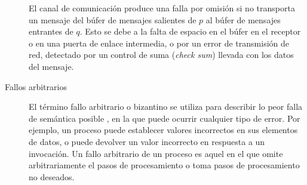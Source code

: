 \begin{description}
	El canal de comunicación produce una falla por omisión si no transporta	un mensaje del búfer de mensajes salientes de $p$ al búfer de mensajes entrantes de $q$. Esto  se debe a la falta de espacio en el búfer en el receptor o en una puerta de enlace intermedia, o por un error de transmisión de red, detectado por un  control de suma (\textit{check sum}) llevada con los datos del mensaje. 


	\item [Fallos arbitrarios]  El término fallo arbitrario o bizantino se utiliza para describir lo peor  falla de  semántica posible , en la que puede ocurrir cualquier tipo de error. Por ejemplo, un proceso puede establecer valores incorrectos en sus elementos de datos, o puede devolver un valor incorrecto en respuesta a un 	invocación.
	Un fallo arbitrario de un proceso es aquel en el que omite arbitrariamente el 	pasos de procesamiento o toma pasos de procesamiento no deseados.  
\end{description}

